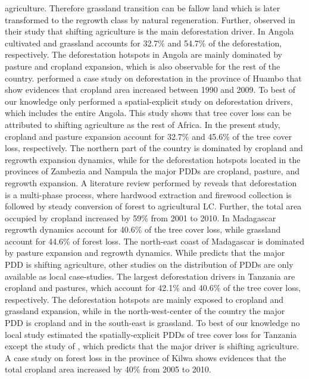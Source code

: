 agriculture. Therefore grassland transition can be fallow land which is later transformed to the regrowth class by natural regeneration. Further, \citet{Curtis2018} observed in their study that shifting agriculture is the main deforestation driver. In Angola cultivated and grassland accounts for 32.7\% and 54.7\% of the deforestation, respectively. The deforestation hotspots in Angola are mainly dominated by pasture and cropland expansion, which is also observable for the rest of the country. \citet{Cabral2011} performed a case study on deforestation in the province of Huambo that show evidences that cropland area increased between 1990 and 2009. To best of our knowledge only \citet{Curtis2018} performed a spatial-explicit study on deforestation drivers, which includes the entire Angola. This study shows that tree cover loss can be attributed to shifting agriculture as the rest of Africa. In the present study, cropland and pasture expansion account for 32.7\% and 45.6\% of the tree cover loss, respectively. The northern part of the country is dominated by cropland and regrowth expansion dynamics, while for the deforestation hotspots located in the provinces of Zambezia and Nampula the major \acp{PDD} are cropland, pasture, and regrowth expansion. A literature review performed by \citet{Sitoe2012} reveals that deforestation is a multi-phase process, where hardwood extraction and firewood collection is followed by steady conversion of forest to agricultural \ac{LC}. Further, the total area occupied by cropland increased by 59\% from 2001 to 2010. In Madagascar regrowth dynamics account for 40.6\% of the tree cover loss, while grassland account for 44.6\% of forest loss. The north-east coast of Madagascar is dominated by pasture expansion and regrowth dynamics. While \citet{Curtis2018} predicts that the major \ac{PDD} is shifting agriculture, other studies on the distribution of \acp{PDD} are only available as local case-studies. The largest deforestation drivers in Tanzania are cropland and pastures, which account for 42.1\% and 40.6\% of the tree cover loss, respectively. The deforestation hotspots are mainly exposed to cropland and grassland expansion, while in the north-west-center of the country the major \ac{PDD} is cropland and in the south-east is grassland. To best of our knowledge no local study estimated the spatially-explicit \acp{PDD} of tree cover loss for Tanzania except the study of \citet{Curtis2018}, which predicts that the major driver is shifting agriculture. A case study on forest loss in the province of Kilwa shows evidences that the total cropland area increased by 40\% from 2005 to 2010.
